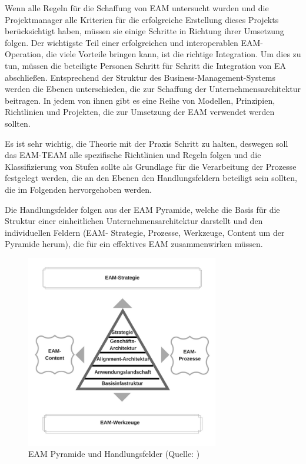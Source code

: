 \documentclass[
	A4paper,
	DIV=9,
	BCOR7mm,
	smallheadings,
	headinclude,
	footinclude,
	headsepline,
	parindent,
	german,
	captions=tableheading,
	abstracton
	]{scrreprt}
\begin{document}
Wenn alle Regeln für die Schaffung von EAM untersucht wurden und die Projektmanager alle Kriterien für die erfolgreiche Erstellung dieses Projekts berücksichtigt haben, müssen sie einige Schritte in Richtung ihrer Umsetzung folgen. Der wichtigste Teil einer erfolgreichen und interoperablen EAM-Operation, die viele Vorteile bringen kann, ist die richtige Integration. Um dies zu tun, müssen die beteiligte Personen Schritt für Schritt die Integration von EA abschließen. Entsprechend der Struktur des Business-Management-Systems werden die Ebenen unterschieden, die zur Schaffung der Unternehmensarchitektur beitragen. In jedem von ihnen gibt es eine Reihe von Modellen, Prinzipien, Richtlinien und Projekten, die zur Umsetzung der EAM verwendet werden sollten.

Es ist sehr wichtig, die Theorie mit der Praxis Schritt zu halten, deswegen soll das EAM-TEAM alle spezifische Richtlinien und Regeln folgen  und die Klassifizierung von Stufen sollte als Grundlage für die Verarbeitung der  Prozesse festgelegt werden, die an den Ebenen den Handlungsfeldern beteiligt sein sollten, die im Folgenden hervorgehoben werden.

Die Handlungsfelder folgen aus der EAM Pyramide, welche die Basis für die Struktur einer einheitlichen Unternehmensarchitektur darstellt und den individuellen Feldern (EAM- Strategie, Prozesse, Werkzeuge, Content um der Pyramide herum), die für ein effektives EAM zusammenwirken müssen.

\begin{figure}[!htbp]
\begin{center}
\includegraphics[width=0.75\textwidth]{Abbildungen/Pyramide.png}
\caption{EAM Pyramide und Handlungsfelder (Quelle: \cite{Keuntje2010})}
\label{fig:pyramide}
\end{center}
\end{figure}
\end{document}
